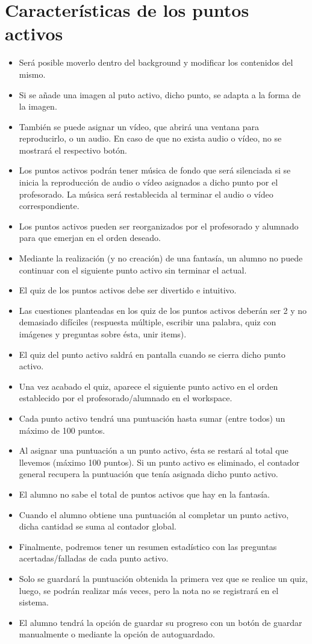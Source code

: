 \section{Características de los puntos activos}
\begin{itemize}
	\item Será posible moverlo dentro del background y modificar los contenidos del mismo.
	\item Si se añade una imagen al puto activo, dicho punto, se adapta a la forma de la imagen.
	\item También se puede asignar un vídeo, que abrirá una ventana para reproducirlo, o un audio. En caso de que no exista audio o vídeo, no se mostrará el respectivo botón.
	\item Los puntos activos podrán tener música de fondo que será silenciada si se inicia la reproducción de audio o vídeo asignados a dicho punto por el profesorado. La música será restablecida al terminar el audio o vídeo correspondiente.
	\item Los puntos activos pueden ser reorganizados por el profesorado y alumnado para que emerjan en el orden deseado.
	\item Mediante la realización (y no creación) de una fantasía, un alumno no puede continuar con el siguiente punto activo sin terminar el actual.
	\item El quiz de los puntos activos debe ser divertido e intuitivo.
	\item Las cuestiones planteadas en los quiz de los puntos activos deberán ser 2 y no demasiado difíciles (respuesta múltiple, escribir una palabra, quiz con imágenes y preguntas sobre ésta, unir items).
	\item El quiz del punto activo saldrá en pantalla cuando se cierra dicho punto activo.
	\item Una vez acabado el quiz, aparece el siguiente punto activo en el orden establecido por el profesorado/alumnado en el workspace.
	\item Cada punto activo tendrá una puntuación hasta sumar (entre todos) un máximo de 100 puntos.
	\item Al asignar una puntuación a un punto activo, ésta se restará al total que llevemos (máximo 100 puntos). Si un punto activo es eliminado, el contador general recupera la puntuación que tenía asignada dicho punto activo.
	\item El alumno no sabe el total de puntos activos que hay en la fantasía.
	\item Cuando el alumno obtiene una puntuación al completar un punto activo, dicha cantidad se suma al contador global.
	\item Finalmente, podremos tener un resumen estadístico con las preguntas acertadas/falladas de cada punto activo.
	\item Solo se guardará la puntuación obtenida la primera vez que se realice un quiz, luego, se podrán realizar más veces, pero la nota no se registrará en el sistema.
	\item El alumno tendrá la opción de guardar su progreso con un botón de guardar manualmente o mediante la opción de autoguardado.
\end{itemize}